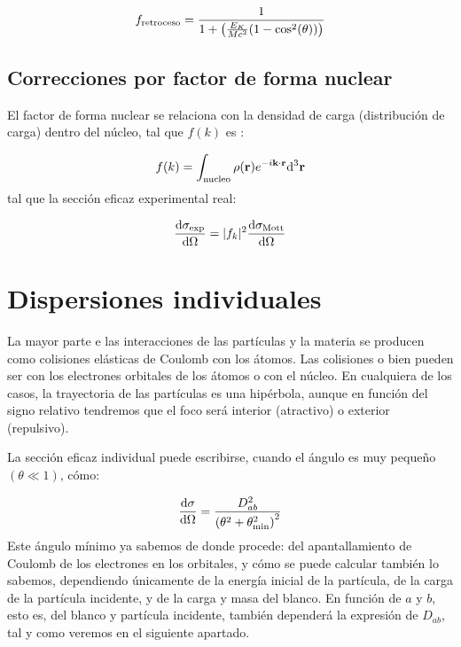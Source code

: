 \begin{equation}
    f_{\text{retroceso}}  = \frac{1}{1+\pqty{\frac{E_K}{Mc^2} (1  - \cos^2 (\theta) )}}
\end{equation}


\subsection{Correcciones por factor de forma nuclear}

El factor de forma nuclear se relaciona con la densidad de carga (distribución de carga) dentro del núcleo, tal que $f(k)$ es :

\begin{equation}
    f(k) = \int_{\text{nucleo}} \rho (\mathbf{r}) e^{-i \mathbf{k} \cdot \mathbf{r}} \mathrm{d}^3 \mathbf{r}
\end{equation}
tal que la sección eficaz experimental real: 

\begin{equation}
     \dv{\sigma_{\text{exp}}}{\Omega} =  |f_{k}|^2 \dv{\sigma_{\text{Mott}}}{\Omega}
\end{equation}

\section{Dispersiones individuales}
 
La mayor parte e las interacciones de las partículas y la materia se producen como colisiones elásticas de Coulomb con los átomos. Las colisiones o bien pueden ser con los electrones orbitales de los átomos o con el núcleo. En cualquiera de los casos, la trayectoria de las partículas es una hipérbola, aunque en función del signo relativo tendremos que el foco será interior (atractivo) o exterior (repulsivo).

La sección eficaz individual puede escribirse, cuando el ángulo es muy pequeño $(\theta \ll 1)$, cómo: 

\begin{equation}
    \dv{\sigma}{\Omega} = \frac{D_{ab}^2}{\pqty{\theta^2 + \theta_{\min}^2}^2}
\end{equation}
Este ángulo mínimo ya sabemos de donde procede: del apantallamiento de Coulomb de los electrones en los orbitales, y cómo se puede calcular también lo sabemos, dependiendo únicamente de la energía inicial de la partícula, de la carga de la partícula incidente, y de la carga y masa del blanco. En función de $a$ y $b$, esto es, del blanco y partícula incidente, también dependerá  la expresión de $D_{ab}$, tal y como veremos en el siguiente apartado.


